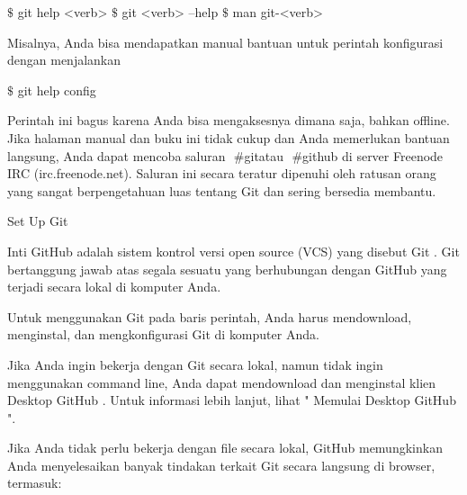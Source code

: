 \vspace{12pt}
\noindent 
 $  \$  $ git help <verb>  $  \$  $ git <verb> --help  $  \$  $ man git-<verb>  \par
\vspace{12pt}
\noindent 
Misalnya, Anda bisa mendapatkan manual bantuan untuk perintah konfigurasi dengan menjalankan \par
\vspace{12pt}
\noindent 
  $  \$  $ git help config  \par
\vspace{12pt}
\noindent 
Perintah ini bagus karena Anda bisa mengaksesnya dimana saja, bahkan offline. $  $Jika halaman manual dan buku ini tidak cukup dan Anda memerlukan bantuan langsung, Anda dapat mencoba saluran $  $ $  \#  $gitatau $  $ $  \#  $github $  $di server Freenode IRC (irc.freenode.net). $  $Saluran ini secara teratur dipenuhi oleh ratusan orang yang sangat berpengetahuan luas tentang Git dan sering bersedia membantu. \par
\vspace{12pt}
\noindent 
Set Up Git \par
\vspace{12pt}
\noindent 
Inti GitHub adalah sistem kontrol versi open source (VCS) yang disebut $  $Git $  $. $  $Git bertanggung jawab atas segala sesuatu yang berhubungan dengan GitHub yang terjadi secara lokal di komputer Anda. \par
\vspace{12pt}
\noindent 
Untuk menggunakan Git pada baris perintah, Anda harus mendownload, menginstal, dan mengkonfigurasi Git di komputer Anda. \par
\vspace{12pt}
\noindent 
Jika Anda ingin bekerja dengan Git secara lokal, namun tidak ingin menggunakan command line, Anda dapat mendownload dan menginstal klien $  $Desktop GitHub $  $. $  $Untuk informasi lebih lanjut, lihat " $  $Memulai Desktop GitHub $  $". \par
\vspace{12pt}
\noindent 
Jika Anda tidak perlu bekerja dengan file secara lokal, GitHub memungkinkan Anda menyelesaikan banyak tindakan terkait Git secara langsung di browser, termasuk: \par
